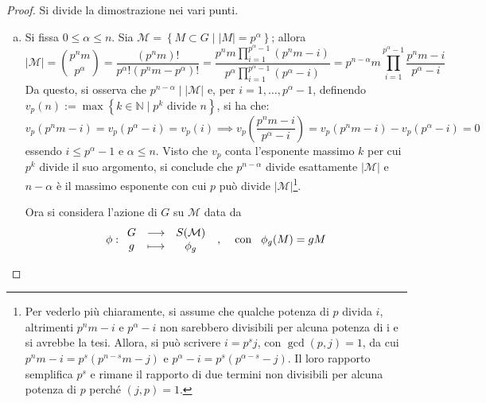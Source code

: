 \documentclass[12pt]{scrartcl}
\theoremstyle{style}
\numberwithin{equation}{subsection}
\begin{document}
	\begin{proof}
		Si divide la dimostrazione nei vari punti.
		\begin{enumerate}[(a).]
			\item Si fissa $0\le \alpha \le n$. 
				Sia $\mathcal{M} = \left\{ M \subset G  \mid \lvert M \rvert = p^\alpha  \right\} $; allora 
				\[
						\lvert \mathcal{M}  \rvert =\binom{p^n m}{p^\alpha } = \frac{(p^nm)!}{p^\alpha ! (p^nm-p^\alpha )!} = \frac{\displaystyle p^n m \prod_{i=1} ^{p^{\alpha }-1 } (p^n m - i)}{p^\alpha \displaystyle \prod_{i=1} ^{p^{\alpha }-1 } (p^{\alpha }-i) } = p^{n-\alpha } m \prod_{i=1} ^{p^{\alpha }-1 } \frac{p^n m - i}{p^\alpha  -i}
				\] 
				Da questo, si osserva che $p^{n-\alpha }  \mid  |\mathcal{M} |$ e, per $i=1,\ldots,p^{\alpha }-1 $, definendo $v_p(n):=\max \left\{ k \in \mathbb{N}  \mid p^k \text{ divide } n \right\} $, si ha che:
				\[
				v_p(p^nm - i) = v_p(p^\alpha -i)=v_p(i)\implies v_p\left(\frac{p^nm - i}{p^{\alpha } -i}\right) =v_p(p^nm-i) - v_p(p^\alpha  - i) = 0
				\] 
				essendo $i\le p^{\alpha }-1 $ e $\alpha \le n$. Visto che $v_p$ conta l'esponente massimo $k$ per cui $p^k$ divide il suo argomento, si conclude che $p^{n-\alpha } $ divide esattamente $\lvert \mathcal{M}  \rvert $ e $n-\alpha $ \`e il massimo esponente con cui $p$ pu\`o divide $\lvert \mathcal{M}  \rvert $\footnote{Per vederlo pi\`u chiaramente, si assume che qualche potenza di $p$ divida $i$, altrimenti $p^nm - i$ e $p^\alpha - i$ non sarebbero divisibili per alcuna potenza di i e si avrebbe la tesi. Allora, si pu\`o scrivere $i = p^s j$, con $\operatorname{gcd}(p,j) =1$, da cui $p^{n} m - i = p^s(p^{n-s} m - j)$ e $p^\alpha - i = p^s (p^{\alpha - s} - j)$. Il loro rapporto semplifica $p^s$ e rimane il rapporto di due termini non divisibili per alcuna potenza di $p$ perch\'e $(j,p) = 1$.}.

				Ora si considera l'azione di $G$ su $\mathcal{M} $ data da 
				\[
					\phi :
				\begin{array}
					{c c c}
					G &\longrightarrow & S(\mathcal{M} ) \\
					g &\longmapsto & \phi _g
				\end{array} \hspace{.2cm}, \hspace{.4cm} \text{con} \hspace{.3cm} \phi _g(M)=gM 
				\] 
				

\end{enumerate}
\end{proof}
\end{document}
